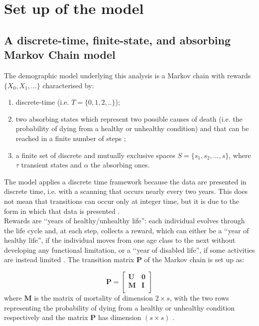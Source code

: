 \documentclass[\main/main.tex]{subfiles}
\begin{document}
\section{Set up of the model}
\subsection{A discrete-time, finite-state, and absorbing\\ Markov Chain model}

The demographic model underlying this analysis is a Markov chain with rewards $\{X_0, X_1, ...\}$ characterised by:
\begin{enumerate}
\item discrete-time (i.e. $T = \{ 0,1,2,..\}$);
\item two absorbing states which represent two possible causes of death (i.e.  the probability of dying from a healthy or unhealthy condition) and that can be reached in a finite number of steps ;
\item a finite set of discrete and mutually exclusive spaces $S = \{s_1, s_2, ..., s\}$, where $\tau$ transient states and $\alpha$ the absorbing ones.
\end{enumerate}
The model applies a discrete time framework because the data are presented in discrete time, i.e. with a scanning that occurs nearly every two years. This does not mean that transitions can occur only at integer time, but it is due to the form in which that data is presented \citep{haberman1999}.\\
Rewards are \lq\lq years of healthy/unhealthy life'': each individual evolves through the life cycle and, at each step, collects a reward, which can either be a \lq\lq year of healthy life'', if the individual moves from one age class to the next without developing any functional limitation, or a \lq\lq year of disabled life'', if some activities are instead limited \citep{Caswell2018}. 
The transition matrix $\mathbf{P}$ of the Markov chain is set up as:

\begin{equation}
    \mathbf{P} = 
    \begin{bmatrix}
    \mathbf{U} & \mathbf{0}\\
    \mathbf{M} & \mathbf{I}\\
    \end{bmatrix}
    \end{equation}
where $\mathbf{M}$  is the matrix of mortality of dimension $2 \times s$, with the two rows representing the probability of dying from a healthy or unhealthy condition respectively and the matrix $\mathbf{P}$ has dimension $(s \times s)$ \citep{Caswell2018a}.
\end{document}
